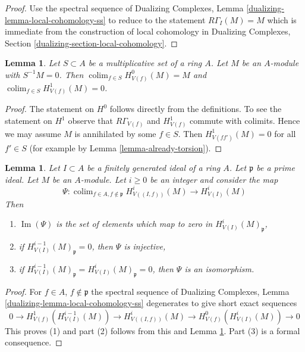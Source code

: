 \documentclass{stacks-project}
\theoremstyle{plain}
\newtheorem{lemma}[subsection]{Lemma}
\theoremstyle{definition}
\theoremstyle{remark}
\numberwithin{equation}{subsection}
\def\colim{\mathop{\mathrm{colim}}\nolimits}
\def\Im{\mathop{\mathrm{Im}}}
\begin{document}
\begin{proof}
Use the spectral sequence of
Dualizing Complexes, Lemma \ref{dualizing-lemma-local-cohomology-ss}
to reduce to the statement $R\Gamma_I(M) = M$ which is immediate
from the construction of local cohomology
in Dualizing Complexes, Section \ref{dualizing-section-local-cohomology}.
\end{proof}

\begin{lemma}
\label{lemma-multiplicative}
Let $S \subset A$ be a multiplicative set of a ring $A$.
Let $M$ be an $A$-module with $S^{-1}M = 0$. Then
$\colim_{f \in S} H^0_{V(f)}(M) = M$ and
$\colim_{f \in S} H^1_{V(f)}(M) = 0$.
\end{lemma}

\begin{proof}
The statement on $H^0$ follows directly from the definitions.
To see the statement on $H^1$ observe that $R\Gamma_{V(f)}$
and $H^1_{V(f)}$ commute with colimits. Hence we may assume
$M$ is annihilated by some $f \in S$. Then
$H^1_{V(ff')}(M) = 0$ for all $f' \in S$ (for example by
Lemma \ref{lemma-already-torsion}).
\end{proof}

\begin{lemma}
\label{lemma-elements-come-from-bigger}
Let $I \subset A$ be a finitely generated ideal of a ring $A$.
Let $\mathfrak p$ be a prime ideal. Let $M$ be an $A$-module.
Let $i \geq 0$ be an integer and consider the map
$$
\Psi :
\colim_{f \in A, f \not \in \mathfrak p} H^i_{V((I, f))}(M)
\longrightarrow
H^i_{V(I)}(M)
$$
Then
\begin{enumerate}
\item $\Im(\Psi)$ is the set of elements which map to zero in
$H^i_{V(I)}(M)_\mathfrak p$,
\item if $H^{i - 1}_{V(I)}(M)_\mathfrak p = 0$, then $\Psi$ is injective,
\item if $H^{i - 1}_{V(I)}(M)_\mathfrak p = H^i_{V(I)}(M)_\mathfrak p = 0$,
then $\Psi$ is an isomorphism.
\end{enumerate}
\end{lemma}

\begin{proof}
For $f \in A$, $f \not \in \mathfrak p$ the spectral sequence of
Dualizing Complexes, Lemma \ref{dualizing-lemma-local-cohomology-ss}
degenerates to give short exact sequences
$$
0 \to H^1_{V(f)}(H^{i - 1}_{V(I)}(M)) \to
H^i_{V((I, f))}(M) \to H^0_{V(f)}(H^i_{V(I)}(M)) \to 0
$$
This proves (1) and part (2) follows from this and
Lemma \ref{lemma-multiplicative}.
Part (3) is a formal consequence.
\end{proof}
\end{document}
